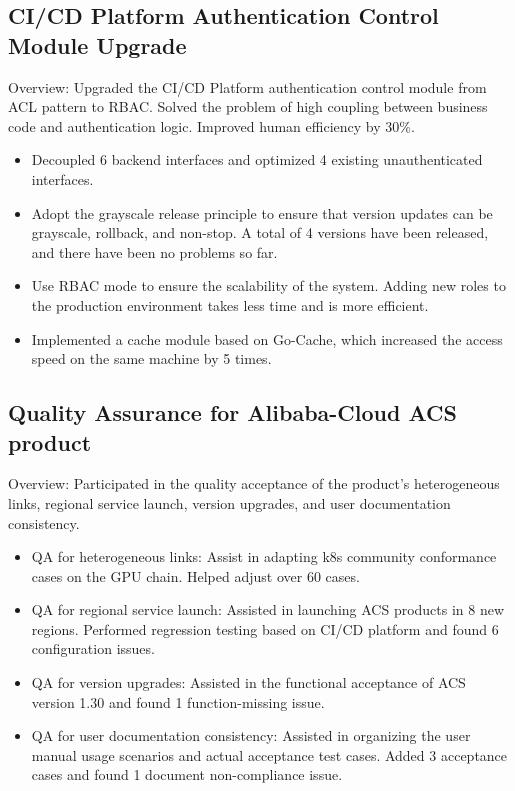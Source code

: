 \documentclass{resume}
\begin{document}
\begin{onehalfspacing}
\subsection{\textbf{CI/CD Platform Authentication Control Module Upgrade}}

Overview: Upgraded the CI/CD Platform authentication control module from ACL pattern to RBAC. Solved the problem of high coupling between business code and authentication logic. Improved human efficiency by 30\%.
\begin{itemize}
  \item Decoupled 6 backend interfaces and optimized 4 existing unauthenticated interfaces.
  \item Adopt the grayscale release principle to ensure that version updates can be grayscale, rollback, and non-stop. A total of 4 versions have been released, and there have been no problems so far.
  \item Use RBAC mode to ensure the scalability of the system. Adding new roles to the production environment takes less time and is more efficient.
  \item Implemented a cache module based on Go-Cache, which increased the access speed on the same machine by 5 times.
\end{itemize}

\subsection{\textbf{Quality Assurance for Alibaba-Cloud ACS product}}
Overview: Participated in the quality acceptance of the product's heterogeneous links, regional service launch, version upgrades, and user documentation consistency.
\begin{itemize}
  \item QA for heterogeneous links: Assist in adapting k8s community conformance cases on the GPU chain. Helped adjust over 60 cases.
  \item QA for regional service launch: Assisted in launching ACS products in 8 new regions. Performed regression testing based on CI/CD platform and found 6 configuration issues.
  \item QA for version upgrades: Assisted in the functional acceptance of ACS version 1.30 and found 1 function-missing issue.
  \item QA for user documentation consistency: Assisted in organizing the user manual usage scenarios and actual acceptance test cases. Added 3 acceptance cases and found 1 document non-compliance issue.
\end{itemize}

\end{onehalfspacing}
\end{document}
